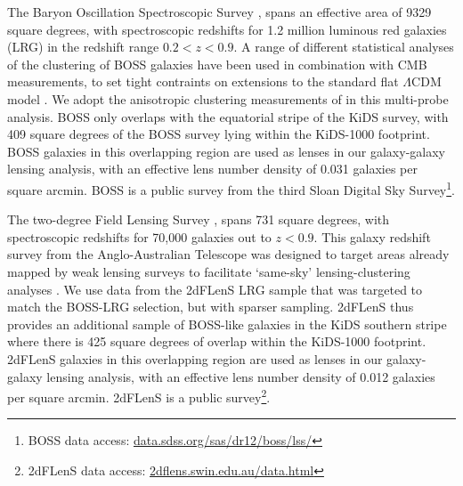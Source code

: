 The Baryon Oscillation Spectroscopic Survey
\citep[BOSS,][]{alam/etal:2015}, spans an effective area of 9329 square
degrees, with spectroscopic redshifts for 1.2 million luminous red
galaxies (LRG) in the redshift range $0.2<z<0.9$.   A range of
different statistical analyses of the clustering of BOSS galaxies have been used in combination with CMB
measurements, to set tight contraints on extensions to the standard
flat $\Lambda$CDM model \citep[see][and references
therein]{alam/etal:2017}.   We adopt the anisotropic clustering
measurements of \citet{sanchez/etal:2017} in this multi-probe analysis.
BOSS only overlaps with the equatorial stripe
of the KiDS survey, with 409 square degrees of the BOSS survey lying within
the KiDS-1000 footprint.  BOSS galaxies in this overlapping region are used as lenses in
our galaxy-galaxy lensing analysis, with an effective lens number density of 0.031
galaxies per square arcmin.  BOSS is a public survey from the third Sloan
Digital Sky Survey\footnote{BOSS data access: \href{https://data.sdss.org/sas/dr12/boss/lss/}{data.sdss.org/sas/dr12/boss/lss/}}.   

The two-degree Field Lensing Survey
\citep[2dFLenS,][]{blake/etal:2016}, spans 731 square degrees, with
spectroscopic redshifts for 70,000 galaxies out to $z<0.9$.   This
galaxy redshift survey from the Anglo-Australian Telescope was designed
to target areas already mapped by weak lensing surveys to facilitate `same-sky'
lensing-clustering analyses
\citep{johnson/etal:2017,amon/etal:2018,joudaki/etal:2018, blake/etal:2020}.
We use data from the 2dFLenS LRG sample that was targeted to match
the BOSS-LRG selection, but with sparser sampling.  2dFLenS
thus provides an additional sample of BOSS-like galaxies in the KiDS
southern stripe where there is 425 square degrees of overlap within
the KiDS-1000 footprint.  2dFLenS galaxies in this overlapping region are used as lenses in
our galaxy-galaxy lensing analysis, with an effective lens number density of 0.012
galaxies per square arcmin.  2dFLenS is a public survey\footnote{2dFLenS data
  access: \href{http://2dflens.swin.edu.au/data.html}{2dflens.swin.edu.au/data.html}}.   


